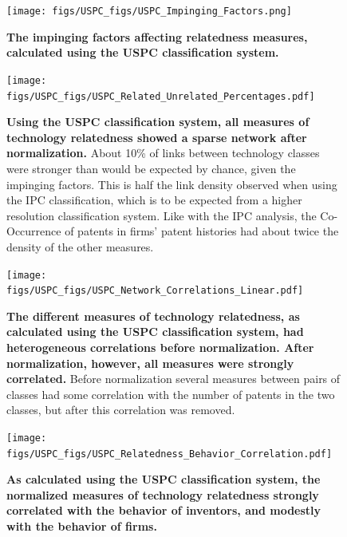 \documentclass[pre,reprint,groupedaddress,superscriptaddress]{revtex4-1}
\begin{document}
\printbibliography

\begin{figure}[p!]
\centering
\texttt{[image: figs/USPC\_figs/USPC\_Impinging\_Factors.png]} 
\caption{\textbf{The impinging factors affecting relatedness measures, calculated using the USPC classification system.}}
\end{figure}

\begin{figure}[p!]
\centering
\texttt{[image: figs/USPC\_figs/USPC\_Related\_Unrelated\_Percentages.pdf]} 
\caption{\textbf{Using the USPC classification system, all measures of technology relatedness showed a sparse network after normalization.} About 10\% of links between technology classes were stronger than would be expected by chance, given the impinging factors. This is half the link density observed when using the IPC classification, which is to be expected from a higher resolution classification system. Like with the IPC analysis, the Co-Occurrence of patents in firms' patent histories had about twice the density of the other measures.}
\end{figure}

\begin{figure}[p!]
\centering
\texttt{[image: figs/USPC\_figs/USPC\_Network\_Correlations\_Linear.pdf]} 
\caption{\textbf{The different measures of technology relatedness, as calculated using the USPC classification system, had heterogeneous correlations before normalization. After normalization, however, all measures were strongly correlated.} Before normalization several measures between pairs of classes had some correlation with the number of patents in the two classes, but after this correlation was removed.}
\end{figure}

\begin{figure}[p!]
\centering
\texttt{[image: figs/USPC\_figs/USPC\_Relatedness\_Behavior\_Correlation.pdf]} 
\caption{\textbf{As calculated using the USPC classification system, the normalized measures of technology relatedness strongly correlated with the behavior of inventors, and modestly with the behavior of firms.}}
\end{figure}


\end{document}
